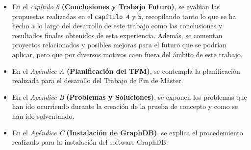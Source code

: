 \begin{itemize}

	\item En el \textit{capítulo 6} \textbf{(Conclusiones y Trabajo Futuro)}, se evalúan las propuestas realizadas en el \texttt{capítulo 4} y \texttt{5}, recopilando tanto lo que se ha hecho a lo largo del desarrollo de este trabajo como las conclusiones y resultados finales obtenidos de esta experiencia. Además, se comentan proyectos relacionados y posibles mejoras para el futuro que se podrían aplicar, pero que por diversos motivos caen fuera del ámbito de este trabajo.
	
	\item En el \textit{Apéndice A} \textbf{(Planificación del TFM)}, se contempla la planificación realizada para el desarollo del Trabajo de Fin de Máster.
	
	
	
	\item En el \textit{Apéndice B} \textbf{(Problemas y Soluciones)}, se exponen los problemas que han ido ocurriendo durante la creación de la prueba de concepto y como se han ido solventando.
	
	\item En el \textit{Apéndice C} \textbf{(Instalación de GraphDB)}, se explica el procedemiento realizado para la instalación del software GraphDB.
		
	
			
	
\end{itemize}


